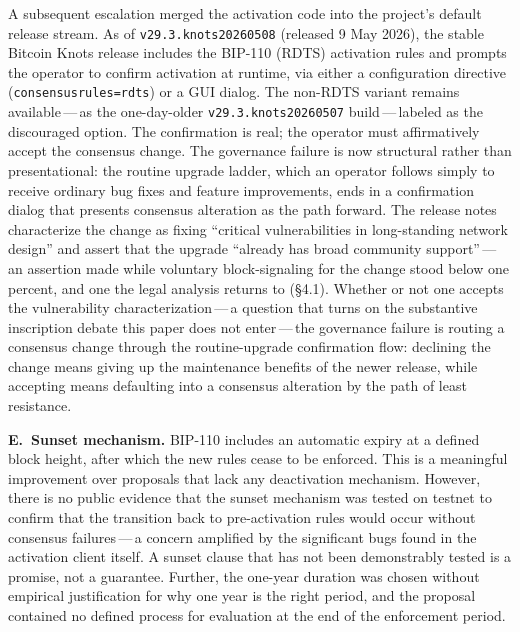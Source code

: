 \documentclass[11pt, twoside, openright]{book}
\newcommand{\reqitem}[2]{\medskip\noindent\textbf{#1\ #2}\quad\ignorespaces}
\newcommand{\sect}[1]{\S#1}
\begin{document}
A subsequent escalation merged the activation code into the project's default release stream. As of \texttt{v29.3.knots20260508} (released 9 May 2026), the stable Bitcoin Knots release includes the BIP-110 (RDTS) activation rules and prompts the operator to confirm activation at runtime, via either a configuration directive (\texttt{consensusrules=rdts}) or a GUI dialog. The non-RDTS variant remains available\,---\,as the one-day-older \texttt{v29.3.knots20260507} build\,---\,labeled as the discouraged option. The confirmation is real; the operator must affirmatively accept the consensus change. The governance failure is now structural rather than presentational: the routine upgrade ladder, which an operator follows simply to receive ordinary bug fixes and feature improvements, ends in a confirmation dialog that presents consensus alteration as the path forward. The release notes characterize the change as fixing ``critical vulnerabilities in long-standing network design'' and assert that the upgrade ``already has broad community support''\,---\,an assertion made while voluntary block-signaling for the change stood below one percent, and one the legal analysis returns to (\sect{4.1}). Whether or not one accepts the vulnerability characterization\,---\,a question that turns on the substantive inscription debate this paper does not enter\,---\,the governance failure is routing a consensus change through the routine-upgrade confirmation flow: declining the change means giving up the maintenance benefits of the newer release, while accepting means defaulting into a consensus alteration by the path of least resistance.

\reqitem{E.}{Sunset mechanism.} BIP-110 includes an automatic expiry at a defined block height, after which the new rules cease to be enforced. This is a meaningful improvement over proposals that lack any deactivation mechanism. However, there is no public evidence that the sunset mechanism was tested on testnet to confirm that the transition back to pre-activation rules would occur without consensus failures\,---\,a concern amplified by the significant bugs found in the activation client itself. A sunset clause that has not been demonstrably tested is a promise, not a guarantee. Further, the one-year duration was chosen without empirical justification for why one year is the right period, and the proposal contained no defined process for evaluation at the end of the enforcement period.

\medskip
\end{document}

